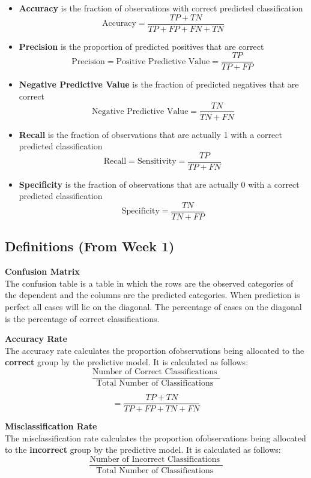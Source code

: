 \documentclass[a4paper,12pt]{article}
\begin{document}
	\begin{itemize}
		\item  \textbf{Accuracy} is the fraction of observations with correct predicted classification
		\[ \mbox{Accuracy}=\frac{TP+TN}{TP+FP+FN+TN}\]
		
		
		\item \textbf{Precision} is the proportion of predicted positives that are correct
		\[
		\mbox{Precision} = \mbox{Positive Predictive Value} =\frac{TP}{TP+FP} \, \]
		
		\item \textbf{Negative Predictive Value} is the  fraction of predicted negatives that are correct
		\[\mbox{Negative Predictive Value} = \frac{TN}{TN+FN}\]
		
		\item \textbf{Recall} is the fraction of observations that are actually 1 with a correct predicted classification
		\[ 
		\mbox{Recall} = \mbox{Sensitivity} = \frac{TP}{TP+FN} \,  \]
		
		\item \textbf{Specificity} is the fraction of observations that are actually 0 with a correct predicted classification
		\[ \mbox{Specificity} = \frac{TN}{TN+FP} \]
		
	\end{itemize}
\medskip
\subsection{Definitions (From Week 1)}
\textbf{Confusion Matrix} \\
The confusion
table is a table in which the rows are the observed categories of the dependent and
the columns are the predicted categories. When prediction is perfect all cases will lie on the
diagonal. The percentage of cases on the diagonal is the percentage of correct classifications. 

\textbf{Accuracy Rate}\\
The accuracy rate calculates the proportion ofobservations being allocated to the \textbf{correct} group by the predictive model. It is calculated as follows:
\[ \frac{
\mbox{Number of Correct Classifications }}{\mbox{Total Number of Classifications }} \]

\[ = \frac{TP + TN}{TP+FP+TN+FN}\]

\medskip

\noindent \textbf{Misclassification Rate}\\
The misclassification rate calculates the proportion ofobservations being allocated to the \textbf{incorrect} group by the predictive model. It is calculated as follows:
\[ \frac{
\mbox{Number of Incorrect Classifications }}{\mbox{Total Number of Classifications }} \]
\end{document}
